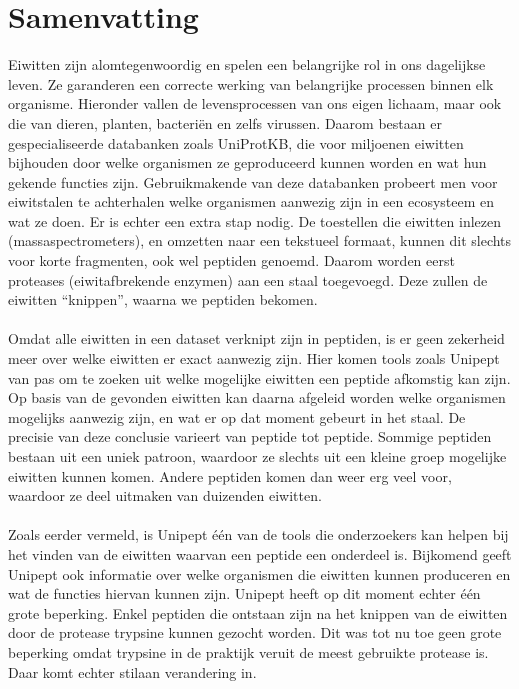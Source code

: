\chapter*{Samenvatting}
Eiwitten zijn alomtegenwoordig en spelen een belangrijke rol in ons dagelijkse leven.
Ze garanderen een correcte werking van belangrijke processen binnen elk organisme.
Hieronder vallen de levensprocessen van ons eigen lichaam, maar ook die van dieren, planten, bacteriën en zelfs virussen.
Daarom bestaan er gespecialiseerde databanken zoals UniProtKB, die voor miljoenen eiwitten bijhouden door welke organismen ze geproduceerd kunnen worden en wat hun gekende functies zijn.
Gebruikmakende van deze databanken probeert men voor eiwitstalen te achterhalen welke organismen aanwezig zijn in een ecosysteem en wat ze doen.
Er is echter een extra stap nodig.
De toestellen die eiwitten inlezen (massaspectrometers), en omzetten naar een tekstueel formaat, kunnen dit slechts voor korte fragmenten, ook wel peptiden genoemd.
Daarom worden eerst proteases (eiwitafbrekende enzymen) aan een staal toegevoegd.
Deze zullen de eiwitten ``knippen'', waarna we peptiden bekomen.
\\ \\
Omdat alle eiwitten in een dataset verknipt zijn in peptiden, is er geen zekerheid meer over welke eiwitten er exact aanwezig zijn.
Hier komen tools zoals Unipept van pas om te zoeken uit welke mogelijke eiwitten een peptide afkomstig kan zijn.
Op basis van de gevonden eiwitten kan daarna afgeleid worden welke organismen mogelijks aanwezig zijn, en wat er op dat moment gebeurt in het staal.
De precisie van deze conclusie varieert van peptide tot peptide.
Sommige peptiden bestaan uit een uniek patroon, waardoor ze slechts uit een kleine groep mogelijke eiwitten kunnen komen.
Andere peptiden komen dan weer erg veel voor, waardoor ze deel uitmaken van duizenden eiwitten.
\\ \\
Zoals eerder vermeld, is Unipept één van de tools die onderzoekers kan helpen bij het vinden van de eiwitten waarvan een peptide een onderdeel is.
Bijkomend geeft Unipept ook informatie over welke organismen die eiwitten kunnen produceren en wat de functies hiervan kunnen zijn.
Unipept heeft op dit moment echter één grote beperking.
Enkel peptiden die ontstaan zijn na het knippen van de eiwitten door de protease trypsine kunnen gezocht worden.
Dit was tot nu toe geen grote beperking omdat trypsine in de praktijk veruit de meest gebruikte protease is.
Daar komt echter stilaan verandering in.
